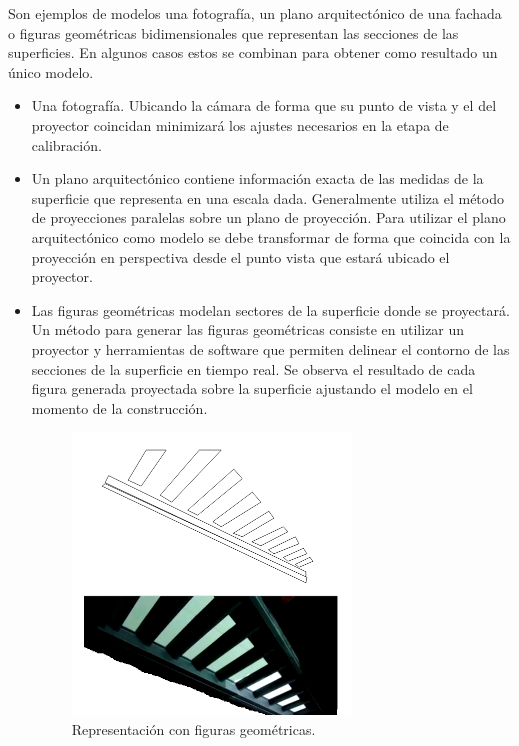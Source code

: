 Son ejemplos de modelos una fotografía, un plano arquitectónico de una fachada o figuras geométricas bidimensionales que representan las secciones de las superficies. En algunos casos estos se combinan para obtener como resultado un único modelo.
\begin{itemize}
  \item Una fotografía. Ubicando la cámara de forma que su punto de vista y el del proyector coincidan minimizará los ajustes necesarios en la etapa de calibración.%
  \item Un plano arquitectónico contiene información exacta de las medidas de la superficie que representa en una escala dada. Generalmente utiliza el método de proyecciones paralelas \cite{LibroCompGrafica} sobre un plano de proyección. Para utilizar el plano arquitectónico como modelo se debe transformar de forma que coincida con la proyección en perspectiva desde el punto vista que estará ubicado el proyector.
  \item Las figuras geométricas modelan sectores de la superficie donde se proyectará. Un método para generar las figuras geométricas consiste en utilizar un proyector y herramientas de software que permiten delinear el contorno de las secciones de la superficie en tiempo real. Se observa el resultado de cada figura generada proyectada sobre la superficie ajustando el modelo en el momento de la construcción.%
\begin{figure}[H]
  \centering
    \includegraphics[width=0.7\textwidth]{./Cap2_videomapping/RepresentacionconfigurasGeometricas}
  \caption{Representación con figuras geométricas.}%
  \label{fig:RepresentacionconfigurasGeometricas}
\end{figure}


\end{itemize}
